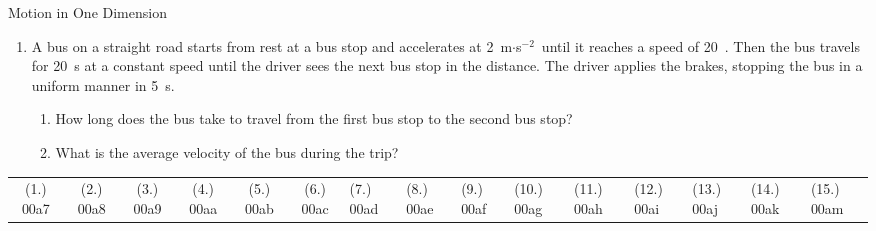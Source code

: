 \begin{eocexercises}{Motion in One Dimension}
\begin{enumerate}[noitemsep, label=\textbf{\arabic*}. ]
\item{A bus on a straight road starts from rest at a bus stop and accelerates at 2~m$\cdot$s$^{-2}$\ until it reaches a speed of 20~\ms. Then the bus travels for 20~s at a constant speed until the driver sees the next bus stop in the distance. The driver applies the brakes, stopping the bus in a uniform manner in 5~s.
\begin{enumerate}
\item How long does the bus take to travel from the first bus stop to the second bus stop?
\item What is the average velocity of the bus during the trip?
\end{enumerate}}
\end{enumerate}
\par \practiceinfo
 \par \begin{tabular}[h]{cccccc}
 (1.) 00a7  &  (2.) 00a8  &  (3.) 00a9  &  (4.) 00aa  &  (5.) 00ab  &  (6.) 00ac  & (7.) 00ad & (8.) 00ae & (9.) 00af & (10.) 00ag &
(11.) 00ah & (12.) 00ai & (13.) 00aj & (14.) 00ak & (15.) 00am
 \end{tabular}
\end{eocexercises}
